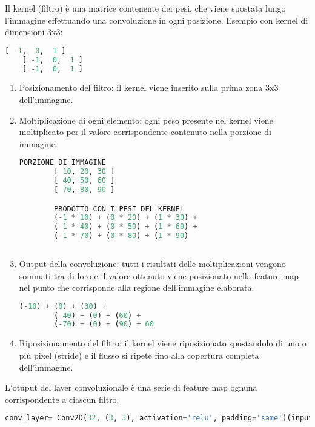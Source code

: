 Il kernel (filtro) è una matrice contenente dei pesi, che viene spostata lungo l'immagine effettuando una convoluzione in ogni posizione.
Esempio con kernel di dimensioni 3x3:

\begin{lstlisting}[language=Python, frame=none]
    [ -1,  0,  1 ]
    [ -1,  0,  1 ]
    [ -1,  0,  1 ]
\end{lstlisting}


\begin{enumerate}
    \item Posizionamento del filtro: il kernel viene inserito sulla prima zona 3x3 dell'immagine.
    \item Moltiplicazione di ogni elemento: ogni peso presente nel kernel viene moltiplicato per il valore corrispondente contenuto nella porzione di immagine.
        
    \begin{lstlisting}[language=Python, frame=none]
        PORZIONE DI IMMAGINE
        [ 10, 20, 30 ]
        [ 40, 50, 60 ]
        [ 70, 80, 90 ]

        PRODOTTO CON I PESI DEL KERNEL
        (-1 * 10) + (0 * 20) + (1 * 30) +
        (-1 * 40) + (0 * 50) + (1 * 60) +
        (-1 * 70) + (0 * 80) + (1 * 90)
            
    \end{lstlisting}
    \item Output della convoluzione: tutti i risultati delle moltiplicazioni vengono sommati tra di loro e il valore ottenuto viene posizionato nella feature map nel punto che corrisponde alla regione dell'immagine elaborata.
    \begin{lstlisting}[language=Python, frame=none]
        (-10) + (0) + (30) +
        (-40) + (0) + (60) +
        (-70) + (0) + (90) = 60
    \end{lstlisting}
    \item Riposizionamento del filtro: il kernel viene riposizionato spostandolo di uno o più pixel (stride) e il flusso si ripete fino alla copertura completa dell'immagine.
\end{enumerate}

L'otuput del layer convoluzionale è una serie di feature map ognuna corrispondente a ciascun filtro.

\begin{lstlisting}[language=Python, frame=none]
    conv_layer= Conv2D(32, (3, 3), activation='relu', padding='same')(input_img)
\end{lstlisting}

